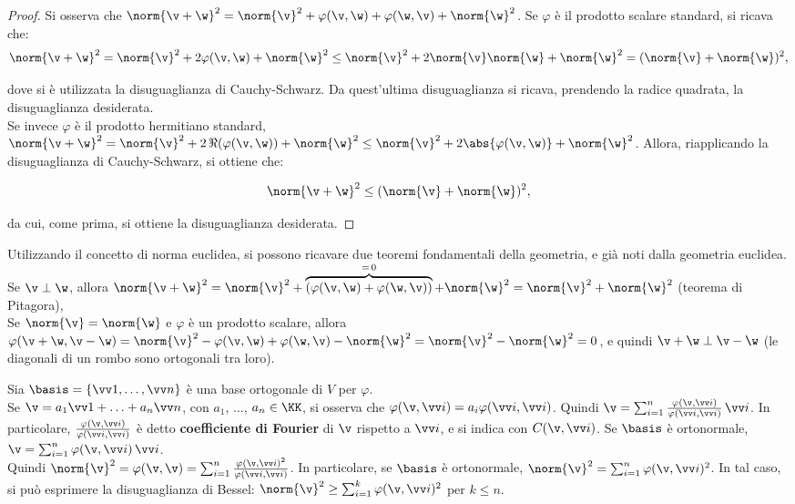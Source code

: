\documentclass[11pt]{article}
\begin{document}
	\begin{proof}
		Si osserva che $\norm{\v + \w}^2 = \norm{\v}^2 + \varphi(\v, \w) + \varphi(\w, \v) + \norm{\w}^2$.
		Se $\varphi$ è il prodotto scalare standard, si ricava che:
		\[ \norm{\v + \w}^2 = \norm{\v}^2 + 2 \varphi(\v, \w) + \norm{\w}^2
		\leq \norm{\v}^2 + 2 \norm{\v} \norm{\w} + \norm{\w}^2 =
		(\norm{\v} + \norm{\w})^2,\]
		
		dove si è utilizzata la disuguaglianza di Cauchy-Schwarz. Da quest'ultima disuguaglianza si ricava, prendendo la radice quadrata, la disuguaglianza
		desiderata. \\
		
		Se invece $\varphi$ è il prodotto hermitiano standard, $\norm{\v + \w}^2 = \norm{\v}^2 + 2 \, \Re(\varphi(\v, \w)) + \norm{\w}^2 \leq \norm{\v}^2 + 2 \abs{\varphi(\v, \w)} + \norm{\w}^2$. Allora, riapplicando
		la disuguaglianza di Cauchy-Schwarz, si ottiene che:
		
		\[ \norm{\v + \w}^2 \leq (\norm{\v} + \norm{\w})^2, \]
		
		da cui, come prima, si ottiene la disuguaglianza desiderata.
	\end{proof}

	\begin{remark}
		Utilizzando il concetto di norma euclidea, si possono ricavare due teoremi fondamentali della geometria,
		e già noti dalla geometria euclidea. \\
		
		\li Se $\v \perp \w$, allora $\norm{\v + \w}^2 = \norm{\v}^2 + \overbrace{(\varphi(\v, \w) + \varphi(\w, \v))}^{=\,0} + \norm{\w}^2 = \norm{\v}^2 + \norm{\w}^2$ (teorema di Pitagora), \\
		\li Se $\norm{\v} = \norm{\w}$ e $\varphi$ è un prodotto scalare, allora $\varphi(\v + \w, \v - \w) = \norm{\v}^2 - \varphi(\v, \w) + \varphi(\w, \v) - \norm{\w}^2  = \norm{\v}^2 - \norm{\w}^2 = 0$, e quindi
		$\v + \w \perp \v - \w$ (le diagonali di un rombo sono ortogonali tra loro).
	\end{remark}

	\begin{remark}
		Sia $\basis = \{ \vv 1, \ldots, \vv n \}$ è una base ortogonale di $V$ per $\varphi$. \\
		
		\li Se $\v = a_1 \vv 1 + \ldots + a_n \vv n$, con $a_1$, ..., $a_n \in \KK$, si osserva
		che $\varphi(\v, \vv i) = a_i \varphi(\vv i, \vv i)$. Quindi $\v = \sum_{i=1}^n \frac{\varphi(\v, \vv i)}{\varphi(\vv i, \vv i)} \, \vv i$. In particolare, $\frac{\varphi(\v, \vv i)}{\varphi(\vv i, \vv i)}$ è
		detto \textbf{coefficiente di Fourier} di $\v$ rispetto a $\vv i$, e si indica con $C(\v, \vv i)$. Se $\basis$ è ortonormale,
		$\v = \sum_{i=1}^n \varphi(\v, \vv i) \, \vv i$. \\
		\li Quindi $\norm{\v}^2 = \varphi(\v, \v) = \sum_{i=1}^n \frac{\varphi(\v, \vv i)^2}{\varphi(\vv i, \vv i)}$. In
		particolare, se $\basis$ è ortonormale, $\norm{\v}^2 = \sum_{i=1}^n \varphi(\v, \vv i)^2$. In tal caso,
		si può esprimere la disuguaglianza di Bessel: $\norm{\v}^2 \geq \sum_{i=1}^k \varphi(\v, \vv i)^2$ per $k \leq n$.
	\end{remark}
\end{document}
